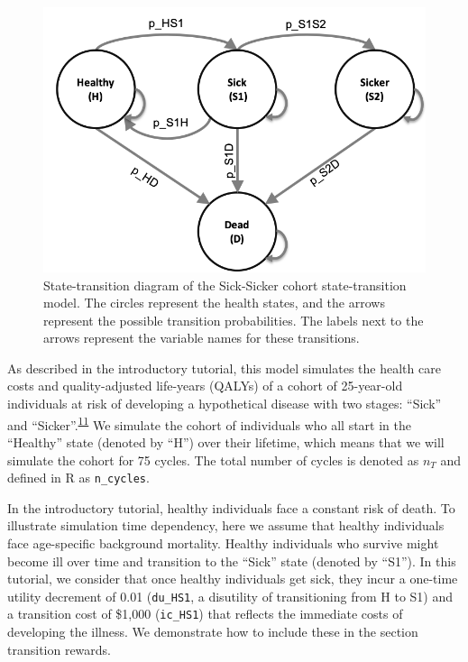 \documentclass[
]{article}
\begin{document}
\begin{figure}[H]

{\centering \includegraphics[width=10.64in]{figs/Sick-Sicker} 

}

\caption{State-transition diagram of the Sick-Sicker cohort state-transition model. The circles represent the health states, and the arrows represent the possible transition probabilities. The labels next to the arrows represent the variable names for these transitions.}\label{fig:STD-Sick-Sicker}
\end{figure}

As described in the introductory tutorial, this model simulates the health care costs and quality-adjusted life-years (QALYs) of a cohort of 25-year-old individuals at risk of developing a hypothetical disease with two stages: ``Sick'' and ``Sicker''.\textsuperscript{\protect\hyperlink{ref-Enns2015e}{11}} We simulate the cohort of individuals who all start in the ``Healthy'' state (denoted by ``H'') over their lifetime, which means that we will simulate the cohort for 75 cycles. The total number of cycles is denoted as \(n_T\) and defined in R as \texttt{n\_cycles}.

In the introductory tutorial, healthy individuals face a constant risk of death. To illustrate simulation time dependency, here we assume that healthy individuals face age-specific background mortality. Healthy individuals who survive might become ill over time and transition to the ``Sick'' state (denoted by ``S1''). In this tutorial, we consider that once healthy individuals get sick, they incur a one-time utility decrement of 0.01 (\texttt{du\_HS1}, a disutility of transitioning from H to S1) and a transition cost of \$1,000 (\texttt{ic\_HS1}) that reflects the immediate costs of developing the illness. We demonstrate how to include these in the section transition rewards.
\end{document}
